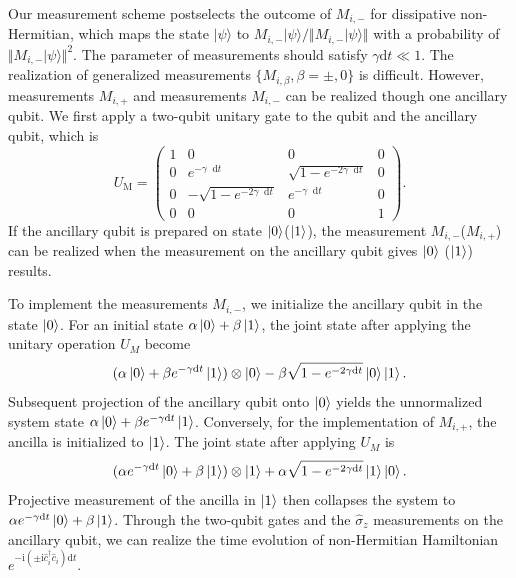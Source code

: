 \documentclass[longbibliography, aps, prx, amsmath, amssymb, amsfonts, twocolumn,superscriptaddress, footinbib]{revtex4-1}
\newcommand{\dif}{\mathop{}\!\mathrm{d}}
\begin{document}
	Our measurement scheme postselects the outcome of $M_{i,-}$ for dissipative non-Hermitian, which maps the state $\vert \psi \rangle$ to $M_{i,-} \vert \psi \rangle/\Vert M_{i,-} \vert \psi \rangle \Vert$ with a probability of $\Vert M_{i,-} \vert \psi \rangle \Vert^2$. 
	The parameter of measurements should satisfy $\gamma \mathrm{d} t \ll 1$.
	The realization of generalized measurements $\{M_{i,\beta}, \beta=\pm,0\}$ is difficult. However, measurements $M_{i,+}$ and measurements $M_{i,-}$ can be realized though one ancillary qubit. We first apply a two-qubit unitary gate to the qubit and the ancillary qubit, which is
	\begin{equation}
		U_{\text{M}} = \begin{pmatrix}
		  1 & 0 & 0 & 0\\
		  0 & e^{-\gamma \dif t} & \sqrt{1-e^{-2 \gamma \dif t}} & 0\\
		  0 & -\sqrt{1-e^{-2 \gamma \dif t}} & e^{-\gamma \dif t} & 0\\
		  0 & 0 & 0 & 1
		\end{pmatrix}.
	\end{equation}
	If the ancillary qubit is prepared on state $\ket{0}$($\ket{1}$), the measurement $M_{i,-}$($M_{i,+}$) can be realized when the measurement on the ancillary qubit gives $\ket{0}$ ($\ket{1}$) results. 

	To implement the measurements $M_{i,-}$, we initialize the ancillary qubit in the state $\ket{0}$. For an initial state $\alpha \ket{0} + \beta \ket{1}$, the joint state after applying the unitary operation $U_M$ become
	\begin{equation}
		(\alpha \ket{0} + \beta e^{-\gamma \mathrm{d}t} \ket{1}) \otimes \ket{0} - \beta \sqrt{1-e^{-2\gamma\mathrm{d}t}} \ket{0} \ket{1}.
	\end{equation}
	Subsequent projection of the ancillary qubit onto $\ket{0}$ yields the unnormalized system state $\alpha \ket{0} + \beta e^{-\gamma \mathrm{d}t} \ket{1}$. 
	Conversely, for the implementation of $M_{i,+}$, the ancilla is initialized to $\ket{1}$. The joint state after applying $U_M$ is
	\begin{equation}
		(\alpha e^{-\gamma \mathrm{d}t} \ket{0} + \beta  \ket{1}) \otimes \ket{1} + \alpha \sqrt{1-e^{-2\gamma\mathrm{d}t}} \ket{1} \ket{0}.
	\end{equation}
	Projective measurement of the ancilla in $\ket{1}$ then collapses the system to $\alpha e^{-\gamma \mathrm{d}t} \ket{0} + \beta  \ket{1}$.
	Through the two-qubit gates and the $\hat{\sigma}_z$ measurements on the ancillary qubit, we can realize the time evolution of non-Hermitian Hamiltonian $e^{-\mathrm{i} (\pm \mathrm{i} \hat{c}_i^{\dagger}\hat{c}_i) \mathrm{d}t}$.
\end{document}
